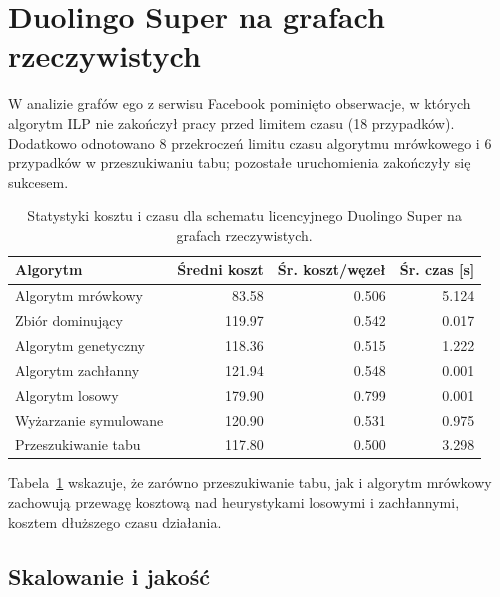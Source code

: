 \section{Duolingo Super na grafach rzeczywistych}
W analizie grafów ego z serwisu Facebook pominięto obserwacje, w których algorytm ILP nie zakończył pracy przed limitem czasu (18 przypadków). Dodatkowo odnotowano 8 przekroczeń limitu czasu algorytmu mrówkowego i 6 przypadków w przeszukiwaniu tabu; pozostałe uruchomienia zakończyły się sukcesem.

\begin{table}[H]
  \centering
  \caption{Statystyki kosztu i czasu dla schematu licencyjnego Duolingo Super na grafach rzeczywistych.}
  \label{tab:duo-real-alg}
  \begin{tabular}{lrrr}
    \toprule
    \textbf{Algorytm}     & \textbf{Średni koszt} & \textbf{Śr. koszt/węzeł} & \textbf{Śr. czas [s]} \\
    \midrule
    Algorytm mrówkowy     & 83.58                 & 0.506                    & 5.124                 \\
    Zbiór dominujący      & 119.97                & 0.542                    & 0.017                 \\
    Algorytm genetyczny   & 118.36                & 0.515                    & 1.222                 \\
    Algorytm zachłanny    & 121.94                & 0.548                    & 0.001                 \\
    Algorytm losowy       & 179.90                & 0.799                    & 0.001                 \\
    Wyżarzanie symulowane & 120.90                & 0.531                    & 0.975                 \\
    Przeszukiwanie tabu   & 117.80                & 0.500                    & 3.298                 \\
    \bottomrule
  \end{tabular}
\end{table}
Tabela~\ref{tab:duo-real-alg} wskazuje, że zarówno przeszukiwanie tabu, jak i algorytm mrówkowy zachowują przewagę kosztową nad heurystykami losowymi i zachłannymi, kosztem dłuższego czasu działania.

\subsection{Skalowanie i jakość}

